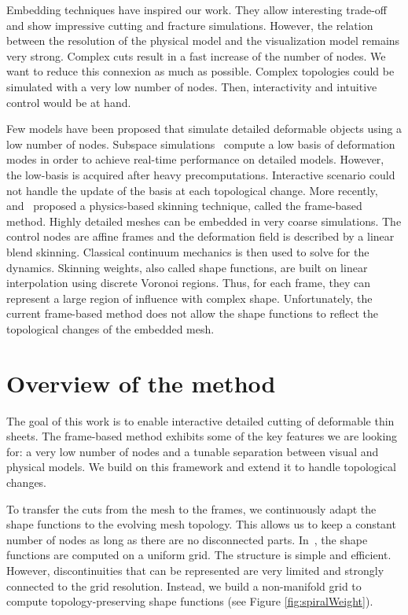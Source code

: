 Embedding techniques have inspired our work. They allow interesting trade-off and show impressive cutting and fracture simulations. However, the relation between the resolution of the physical model and the visualization model remains very strong. Complex cuts result in a fast increase of the number of nodes. We want to reduce this connexion as much as possible. Complex topologies could be simulated with a very low number of nodes. Then, interactivity and intuitive control would be at hand.

Few models have been proposed that simulate detailed deformable objects using a low number of nodes. 
Subspace simulations~\cite{Barbic:2005:RTSI} compute a low basis of deformation modes in order to achieve real-time performance on detailed models. 
However, the low-basis is acquired after heavy precomputations. 
Interactive scenario could not handle the update of the basis at each topological change. 
More recently,~\cite{Gilles2011} and~\cite{Faure2011} proposed a physics-based skinning technique, called the frame-based method. 
Highly detailed meshes can be embedded in very coarse simulations. 
The control nodes are affine frames and the deformation field is described by a linear blend skinning. 
Classical continuum mechanics is then used to solve for the dynamics. 
Skinning weights, also called shape functions, are built on linear interpolation using discrete Voronoi regions. 
Thus, for each frame, they can represent a large region of influence with complex shape. 
Unfortunately, the current frame-based method does not allow the shape functions to reflect the topological changes of the embedded mesh.

\section{Overview of the method}

The goal of this work is to enable interactive detailed cutting of deformable thin sheets. 
The frame-based method exhibits some of the key features we are looking for: a very low number of nodes and a tunable separation between visual and physical models.  
We build on this framework and extend it to handle topological changes.

To transfer the cuts from the mesh to the frames, we continuously adapt the shape functions to the evolving mesh topology. 
This allows us to keep a constant number of nodes as long as there are no disconnected parts. 
In~\cite{Faure2011}, the shape functions are computed on a uniform grid.
The structure is simple and efficient. 
However, discontinuities that can be represented are very limited and strongly connected to the grid resolution. 
Instead, we build a non-manifold grid to compute topology-preserving shape functions (see Figure \ref{fig:spiralWeight}).


